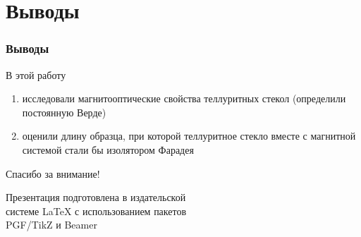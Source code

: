 \documentclass[10pt,pdf,hyperref={unicode}, dvipsnames, handout]{beamer}
\begin{document}
\section{Выводы}
\begin{frame}
	\frametitle{Выводы}
	В этой работу
		\begin{enumerate}
		\item исследовали магнитооптические свойства теллуритных стекол (определили постоянную Верде)
		\item оценили длину образца, при которой теллуритное стекло вместе с магнитной системой стали бы изолятором Фарадея
	\end{enumerate}
\end{frame}

\begin{frame}[plain]
	\vspace{4cm}
	\begin{center}
		\Huge
		Спасибо за внимание!
	\end{center}
	\vspace{2.5cm}
	\begin{center}
		\color{black!30!white}
		Презентация подготовлена в издательской \\
		системе LaTeX с использованием пакетов \\
		PGF/TikZ и Beamer
	\end{center}
\end{frame}

\end{document}
